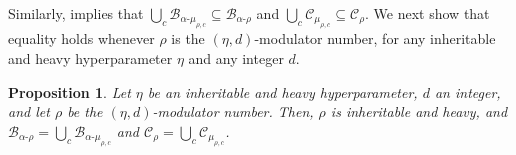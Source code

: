 \documentclass[11pt]{article}
\newcommand{\rhocm}{\mu_{\rho,c}}
\theoremstyle{plain}
\newtheorem{proposition}[theorem]{Proposition}
\theoremstyle{definition}
\theoremstyle{remark}
\numberwithin{equation}{section}
\begin{document}
Similarly,  implies that $\bigcup_{c}\mathcal{B}_{\alpha\text{-}\rhocm}\subseteq \mathcal{B}_{\alpha\text{-}\rho}$ and $\bigcup_{c}\mathcal{C}_{\rhocm}\subseteq \mathcal{C}_{\rho}$.
We next show that equality holds whenever $\rho$ is the $(\eta,d)$-modulator number, for any inheritable and heavy hyperparameter $\eta$ and any integer $d$.

\begin{proposition}\label{prop:modulators-equality}
Let $\eta$ be an inheritable and heavy hyperparameter, $d$ an integer, and let $\rho$ be the $(\eta,d)$-modulator number.
Then, $\rho$ is inheritable and heavy, and $\mathcal{B}_{\alpha\text{-}\rho} = \bigcup_{c}\mathcal{B}_{\alpha\text{-}\rhocm}$ and $\mathcal{C}_{\rho} = \bigcup_{c}\mathcal{C}_{\rhocm}$.
\end{proposition}
\end{document}
